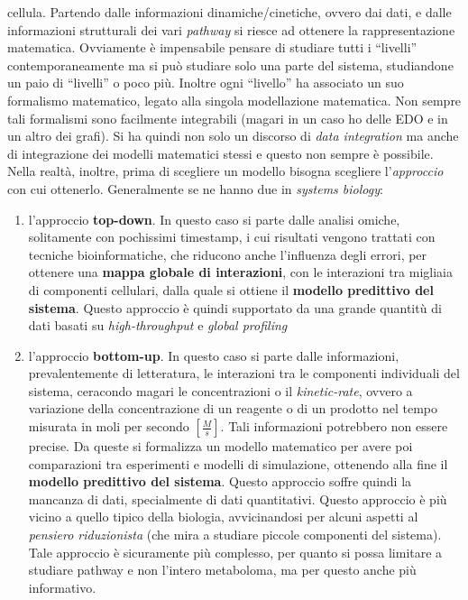 \documentclass[a4paper,12pt, oneside]{book}
\begin{document}
cellula. Partendo dalle informazioni dinamiche/cinetiche, ovvero dai dati, e
dalle informazioni strutturali dei vari \textit{pathway} si riesce ad ottenere
la rappresentazione matematica. Ovviamente è impensabile pensare di studiare
tutti i ``livelli'' contemporaneamente ma si può studiare solo una parte del
sistema, studiandone un paio di ``livelli'' o poco più. Inoltre ogni ``livello''
ha associato un suo formalismo matematico, legato alla singola modellazione
matematica. Non sempre tali formalismi sono facilmente integrabili (magari in un
caso ho delle EDO e in un altro dei grafi). Si ha quindi non solo un discorso di
\textit{data integration} ma anche di integrazione dei modelli matematici stessi
e questo non sempre è possibile.\\
Nella realtà, inoltre, prima di scegliere un modello bisogna scegliere
l'\textit{approccio} con cui ottenerlo. Generalmente se ne hanno due in
\textit{systems biology}: 
\begin{enumerate}
  \item l'approccio \textbf{top-down}. In questo caso si parte dalle analisi
  omiche, solitamente con pochissimi timestamp, i cui risultati vengono trattati
  con tecniche bioinformatiche, che riducono anche l'influenza degli errori, per 
  ottenere una \textbf{mappa globale di interazioni}, con le interazioni tra
  migliaia di componenti cellulari, dalla quale si ottiene il
  \textbf{modello predittivo del sistema}. Questo approccio è quindi supportato
  da una grande quantitù di dati basati su \textit{high-throughput} e
  \textit{global profiling}
  \item l'approccio \textbf{bottom-up}. In questo caso si parte dalle
  informazioni, prevalentemente di letteratura, le interazioni tra le componenti
  individuali del sistema, ceracondo magari le concentrazioni o il
  \textit{kinetic-rate}, ovvero a variazione della concentrazione di un reagente
  o di un prodotto nel tempo misurata in moli per secondo
  $\left[\frac{M}{s}\right]$. Tali informazioni potrebbero non essere
  precise. Da  
  queste si formalizza un modello matematico per 
  avere poi comparazioni tra esperimenti e modelli di simulazione, ottenendo
  alla fine il \textbf{modello predittivo del sistema}. Questo approccio soffre
  quindi la mancanza di dati, specialmente di dati quantitativi. Questo
  approccio è più vicino a quello tipico della biologia, avvicinandosi per
  alcuni aspetti al \textit{pensiero riduzionista} (che mira a studiare piccole
  componenti del sistema).\\
  Tale approccio è sicuramente più complesso, per quanto si possa limitare a
  studiare pathway e non l'intero metaboloma, ma per questo anche più
  informativo. 
\end{enumerate}
\end{document}
